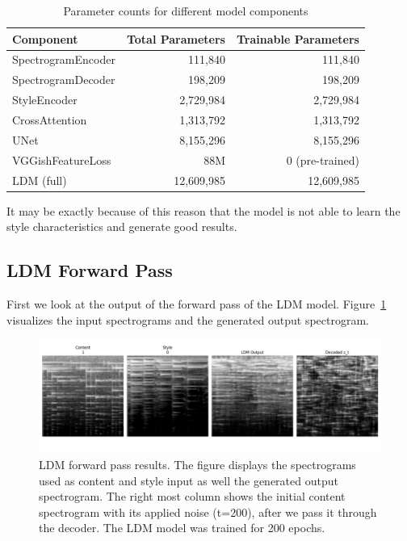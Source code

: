 \begin{table}[h]
\centering
\caption{Parameter counts for different model components}
\label{tab:param_counts}
\begin{tabular}{lrr}
\hline
\textbf{Component} & \textbf{Total Parameters} & \textbf{Trainable Parameters} \\
\hline
SpectrogramEncoder & 111,840 & 111,840 \\
SpectrogramDecoder & 198,209 & 198,209 \\
StyleEncoder & 2,729,984 & 2,729,984 \\
CrossAttention & 1,313,792 & 1,313,792 \\
UNet & 8,155,296 & 8,155,296 \\
VGGishFeatureLoss & 88M & 0 (pre-trained)\\
\hline
LDM (full) & 12,609,985 & 12,609,985 \\
\hline
\end{tabular}
\end{table}

\noindent It may be exactly because of this reason that the model is not able to learn the style characteristics and generate good results.


\subsection{LDM Forward Pass}
First we look at the output of the forward pass of the LDM model.
Figure~\ref{fig:ldm_forward_pass} visualizes the input spectrograms and the generated output spectrogram.

\begin{figure}[h]
    \centering
    \includegraphics[width=\textwidth]{figures/test_ldm_forward_function_output_200epochs.png}
    \caption{LDM forward pass results.
    The figure displays the spectrograms used as content and style input as well the generated output spectrogram. 
    The right most column shows the initial content spectrogram with its applied noise (t=200), after we pass it through the decoder. 
    The LDM model was trained for 200 epochs.}
    \label{fig:ldm_forward_pass}
\end{figure}

